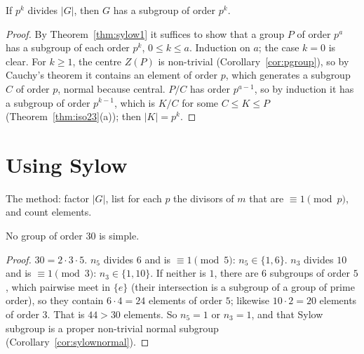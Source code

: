 \begin{corollary}\label{cor:pk}
If $p^k$ divides $|G|$, then $G$ has a subgroup of order $p^k$.
\end{corollary}
\begin{proof}
By Theorem~\ref{thm:sylow1} it suffices to show that a group $P$ of order $p^a$ has a subgroup of each order $p^k$, $0\le k\le a$. Induction on $a$; the case $k=0$ is clear. For $k\ge1$, the centre $Z(P)$ is non-trivial (Corollary~\ref{cor:pgroup}), so by Cauchy's theorem it contains an element of order $p$, which generates a subgroup $C$ of order $p$, normal because central. $P/C$ has order $p^{a-1}$, so by induction it has a subgroup of order $p^{k-1}$, which is $K/C$ for some $C\le K\le P$ (Theorem~\ref{thm:iso23}(a)); then $|K|=p^k$.
\end{proof}

\section{Using Sylow}

The method: factor $|G|$, list for each $p$ the divisors of $m$ that are $\equiv1\pmod p$, and count elements.

\begin{proposition}\label{prop:thirty}
No group of order $30$ is simple.
\end{proposition}
\begin{proof}
$30=2\cdot3\cdot5$. $n_5$ divides $6$ and is $\equiv1\pmod5$: $n_5\in\{1,6\}$. $n_3$ divides $10$ and is $\equiv1\pmod3$: $n_3\in\{1,10\}$. If neither is $1$, there are $6$ subgroups of order $5$, which pairwise meet in $\{e\}$ (their intersection is a subgroup of a group of prime order), so they contain $6\cdot4=24$ elements of order $5$; likewise $10\cdot2=20$ elements of order $3$. That is $44>30$ elements. So $n_5=1$ or $n_3=1$, and that Sylow subgroup is a proper non-trivial normal subgroup (Corollary~\ref{cor:sylownormal}).
\end{proof}


